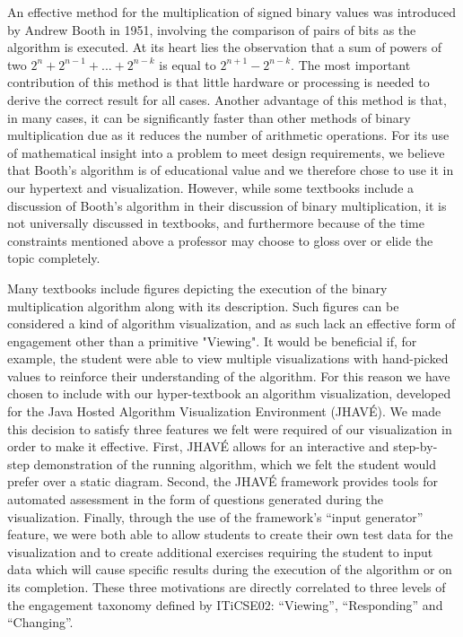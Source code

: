 \documentclass{acm_proc_article-sp}
\begin{document}
An effective method for the multiplication of signed binary values was introduced by Andrew Booth in 1951, involving the comparison of pairs of bits as the algorithm is executed.
At its heart lies the observation that a sum of powers of two $2^n + 2^{n-1} + ...
+ 2^{n-k}$ is equal to $2^{n+1} - 2^{n-k}$.
The most important contribution of this method is that little hardware or processing is needed to derive the correct result for all cases\cite{booth}.
Another advantage of this method is that, in many cases, it can be significantly faster than other methods of binary multiplication due as it reduces the number of arithmetic operations.\cite{text1}
For its use of mathematical insight into a problem to meet design requirements, we believe that Booth's algorithm is of educational value and we therefore chose to use it in our hypertext and visualization.
However, while some textbooks include a discussion of Booth's algorithm in their discussion of binary multiplication, it is not universally discussed in textbooks, and furthermore because of the time constraints mentioned above a professor may choose to gloss over or elide the topic completely.

Many textbooks include figures depicting the execution of the binary multiplication algorithm along with its description\cite{needsCitation}.
Such figures can be considered a kind of algorithm visualization, and as such lack an effective form of engagement other than a primitive "Viewing".
It would be beneficial if, for example, the student were able to view multiple visualizations with hand-picked values to reinforce their understanding of the algorithm.
For this reason we have chosen to include with our hyper-textbook an algorithm visualization, developed for the Java Hosted Algorithm Visualization Environment (JHAVÉ)\cite{JHAVE}.
We made this decision to satisfy three features we felt were required of our visualization in order to make it effective.
First, JHAVÉ allows for an interactive and step-by-step demonstration of the running algorithm, which we felt the student would prefer over a static diagram.
Second, the JHAVÉ framework provides tools for automated assessment in the form of questions generated during the visualization.
Finally, through the use of the framework's ``input generator'' feature, we were both able to allow students to create their own test data for the visualization and to create additional exercises requiring the student to input data which will cause specific results during the execution of the algorithm or on its completion.
These three motivations are directly correlated to three levels of the engagement taxonomy defined by ITiCSE02: ``Viewing'', ``Responding'' and ``Changing''.
\end{document}

